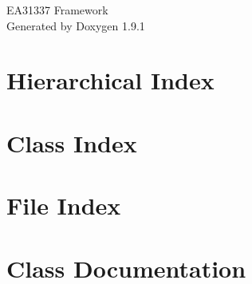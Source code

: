 \let\mypdfximage\pdfximage\def\pdfximage{\immediate\mypdfximage}\documentclass[twoside]{book}
\newcommand{\+}{\discretionary{\mbox{\scriptsize$\hookleftarrow$}}{}{}}
\newcommand{\clearemptydoublepage}{%
  \newpage{\pagestyle{empty}\cleardoublepage}%
}
\begin{document}
\raggedbottom

\hypersetup{pageanchor=false,
             bookmarksnumbered=true,
             pdfencoding=unicode
            }
\begin{titlepage}
\vspace*{7cm}
\begin{center}%
{\Large EA31337 Framework }\\
\vspace*{1cm}
{\large Generated by Doxygen 1.9.1}\\
\end{center}
\end{titlepage}
\clearemptydoublepage
{}
\tableofcontents
\clearemptydoublepage
{}
\hypersetup{pageanchor=true}

\chapter{Hierarchical Index}

\chapter{Class Index}

\chapter{File Index}

\chapter{Class Documentation}







































\end{document}
